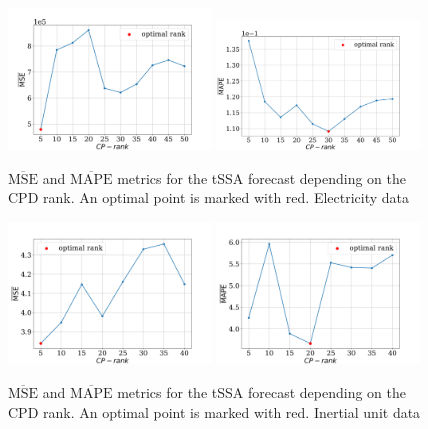 \documentclass[referee, pdflatex, sn-mathphys-num]{sn-jnl}
\theoremstyle{definition}
\theoremstyle{plain}
\begin{document}
		\begin{figure}[h]
			\centering
			\includegraphics[width=0.48\textwidth, keepaspectratio]{pred_MSE_rank_elec.png}
			\includegraphics[width=0.48\textwidth, keepaspectratio]{pred_MAPE_rank_elec.png}
			\caption{$ \overline{\text{MSE}} $ and $ \overline{\text{MAPE}} $ metrics for the tSSA forecast depending on the CPD rank. An optimal point is marked with red. Electricity data}\label{fig:mse_mape_electr}
		\end{figure}
		
		\begin{figure}[h]
			\centering
			\includegraphics[width=0.48\textwidth, keepaspectratio]{pred_MSE_rank_motion.png}
			\includegraphics[width=0.48\textwidth, keepaspectratio]{pred_MAPE_rank_motion.png}
			\caption{$ \overline{\text{MSE}} $ and $ \overline{\text{MAPE}} $ metrics for the tSSA forecast depending on the CPD rank. An optimal point is marked with red. Inertial unit data}\label{fig:mse_mape_motion}
		\end{figure}
		
\end{document}
